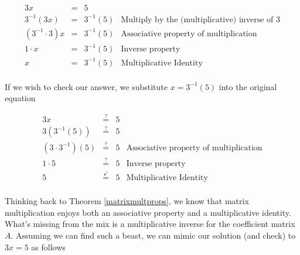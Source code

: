 \[ \begin{array}{rclr}

3x & = & 5 \\
3^{-1}(3x) & = & 3^{-1}(5) & \text{Multiply by the (multiplicative) inverse of $3$} \\
\left(3^{-1}\cdot 3\right) x & = & 3^{-1}(5) & \text{Associative property of multiplication} \\
1 \cdot x &  = & 3^{-1}(5) & \text{Inverse property} \\
 x &  = & 3^{-1}(5) & \text{Multiplicative Identity} \\
 
\end{array} \]

If we wish to check our answer, we substitute $x = 3^{-1}(5)$ into the original equation

\[ \begin{array}{rclr}

3x & \stackrel{?}{=} & 5 \\
3\left( 3^{-1}(5)\right) & \stackrel{?}{=} & 5 \\
\left(3 \cdot 3^{-1}\right)(5) & \stackrel{?}{=} & 5 & \text{Associative property of multiplication}  \\
1 \cdot 5 & \stackrel{?}{=} & 5 & \text{Inverse property} \\
5 & \stackrel{\checkmark}{=} & 5 & \text{Multiplicative Identity} \\
\end{array} \]

Thinking back to Theorem \ref{matrixmultprops}, we know that matrix multiplication enjoys both an associative property and a multiplicative identity.  What's missing from the mix is a multiplicative inverse for the coefficient matrix $A$.  Assuming we can find such a beast, we can mimic our solution (and check) to $3x=5$ as follows

